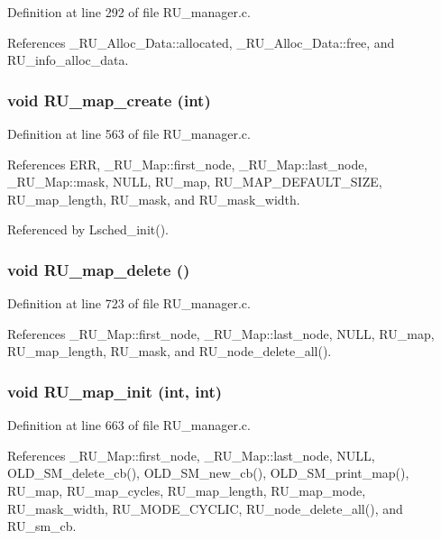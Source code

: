 Definition at line 292 of file RU\_\-manager.c.

References \_\-RU\_\-Alloc\_\-Data::allocated, \_\-RU\_\-Alloc\_\-Data::free, and RU\_\-info\_\-alloc\_\-data.
\subsubsection{\setlength{\rightskip}{0pt plus 5cm}void RU\_\-map\_\-create (int)}\label{RU__manager_8h_107060b82b808a89e050dfd1e48cfaf5}




Definition at line 563 of file RU\_\-manager.c.

References ERR, \_\-RU\_\-Map::first\_\-node, \_\-RU\_\-Map::last\_\-node, \_\-RU\_\-Map::mask, NULL, RU\_\-map, RU\_\-MAP\_\-DEFAULT\_\-SIZE, RU\_\-map\_\-length, RU\_\-mask, and RU\_\-mask\_\-width.

Referenced by Lsched\_\-init().
\subsubsection{\setlength{\rightskip}{0pt plus 5cm}void RU\_\-map\_\-delete ()}\label{RU__manager_8h_d1c9b9ac585b8b3b21b3333341b3ea64}




Definition at line 723 of file RU\_\-manager.c.

References \_\-RU\_\-Map::first\_\-node, \_\-RU\_\-Map::last\_\-node, NULL, RU\_\-map, RU\_\-map\_\-length, RU\_\-mask, and RU\_\-node\_\-delete\_\-all().
\subsubsection{\setlength{\rightskip}{0pt plus 5cm}void RU\_\-map\_\-init (int, int)}\label{RU__manager_8h_608a308dfcee869eb90db3f407aa9677}




Definition at line 663 of file RU\_\-manager.c.

References \_\-RU\_\-Map::first\_\-node, \_\-RU\_\-Map::last\_\-node, NULL, OLD\_\-SM\_\-delete\_\-cb(), OLD\_\-SM\_\-new\_\-cb(), OLD\_\-SM\_\-print\_\-map(), RU\_\-map, RU\_\-map\_\-cycles, RU\_\-map\_\-length, RU\_\-map\_\-mode, RU\_\-mask\_\-width, RU\_\-MODE\_\-CYCLIC, RU\_\-node\_\-delete\_\-all(), and RU\_\-sm\_\-cb.

